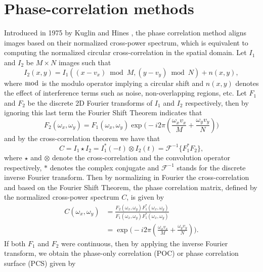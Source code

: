 \section{Phase-correlation methods}
\label{sec:phasecorrelationChapter1}
Introduced in 1975 by Kuglin and Hines \cite{Kug75}, the phase correlation method aligns images based on their normalized cross-power spectrum, which is equivalent to computing the normalized circular cross-correlation in the spatial domain. Let $I_1$ and $I_2$ be $M \times N$ images such that 
\begin{equation}
	I_2(x,y) = I_1((x-v_x) \bmod M, (y-v_y) \bmod N) + n(x,y),
	\label{eq:circularshift}
\end{equation}
where $\bmod$ is the modulo operator implying a circular shift and $n(x,y)$ denotes the effect of interference terms such as noise, non-overlapping regions, etc. Let $F_1$ and $F_2$ be the discrete 2D Fourier transforms of $I_1$ and $I_2$ respectively, then by ignoring this last term the Fourier Shift Theorem indicates that
\begin{equation}
F_2(\omega_x, \omega_y) = F_1(\omega_x, \omega_y) \exp\bigg(-i2\pi\left(\frac{\omega_x v_x}{M} + \frac{\omega_y v_y}{N}\right)\bigg)
\label{eq:FourierShiftTheoremComplete}
\end{equation}
and by the cross-correlation theorem we have that
\begin{equation}
C = I_1 \star I_2 = I_1^*(-t) \otimes I_2(t) = \mathcal{F}^{-1}\{F_1^* F_2\}	,
\label{eq:correlationInFourier}
\end{equation}
where $\star$ and $\otimes$ denote the cross-correlation and the convolution operator respectively, $*$ denotes the complex conjugate and $\mathcal{F}^{-1}$ stands for the discrete inverse Fourier transform. Then by normalizing in Fourier the cross-correlation and based on the Fourier Shift Theorem, the phase correlation matrix, defined by the normalized cross-power spectrum $C$, is given by 
\begin{align}
\label{eq:cps}
C(\omega_x,\omega_y) &= \frac{F_2(\omega_x,\omega_y)F_1^*(\omega_x,\omega_y)}{F_1(\omega_x,\omega_y)F_1^*(\omega_x,\omega_y)}\\
\nonumber &= \exp \bigg(-i 2 \pi \left( \frac{\omega_x v_x}{M} + \frac{\omega_y v_y}{N}\right)\bigg).
\end{align}
If both $F_1$ and $F_2$ were continuous, then by applying the inverse Fourier transform, we obtain the phase-only correlation (POC) \cite{Takita2003} or phase correlation surface (PCS) \cite{Ren_2014} given by
